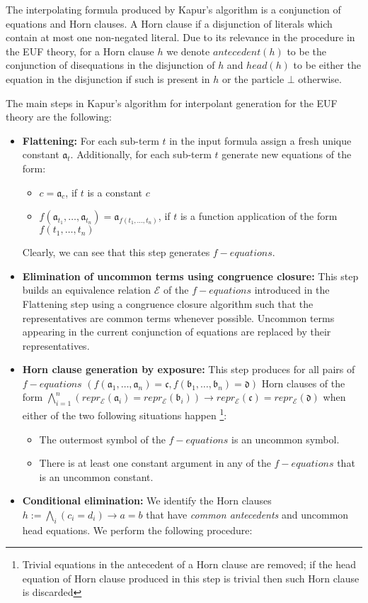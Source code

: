 The interpolating formula produced by Kapur's algorithm is a conjunction of equations
and Horn clauses. A Horn clause if a disjunction of literals which contain at most
one non-negated literal.
Due to its relevance in the procedure in the EUF theory, for a Horn clause $h$
we denote $antecedent(h)$ to be the conjunction of disequations in the disjunction of $h$ 
and $head(h)$ to be either the equation in the disjunction if such is present in $h$ 
or the particle $\bot$ otherwise.

The main steps in Kapur's algorithm for interpolant generation for the EUF theory
are the following:

\begin{itemize}
  \item \textbf{Flattening:} 
    For each sub-term $t$ in the input formula assign a fresh unique constant $\mathfrak{a}_t$. 
    Additionally, for each sub-term $t$ generate new equations of the form:
    \begin{itemize}
      \item $c = \mathfrak{a}_c$, if $t$ is a constant $c$
      \item $f(\mathfrak{a}_{t_1}, \dots, \mathfrak{a}_{t_n}) 
        = \mathfrak{a}_{f(t_1, \dots, t_n)}$, if $t$ is a 
        function application of the form $f(t_1, \dots, t_n)$
    \end{itemize}
    Clearly, we can see that this step generates $f-equations$.
  \item \textbf{Elimination of uncommon terms using congruence closure:}
    This step builds an equivalence 
    relation $\mathcal{E}$ of the $f-equations$ introduced in the 
    Flattening step using a congruence closure algorithm such 
    that the representatives are common terms
    whenever possible. Uncommon terms appearing in the current conjunction of 
    equations are replaced by their representatives.
  \item \textbf{Horn clause generation by exposure:} 
    This step produces for all pairs of $f-equations$ 
    $(f(\mathfrak{a}_1, \dots, \mathfrak{a}_n) = \mathfrak{c}, 
    f(\mathfrak{b}_1, \dots, \mathfrak{b}_n) = \mathfrak{d})$
    Horn clauses of the form 
    $\bigwedge_{i=1}^n(repr_{\mathcal{E}}(\mathfrak{a}_i) = repr_{\mathcal{E}}(\mathfrak{b}_i))
    \rightarrow repr_{\mathcal{E}}(\mathfrak{c}) = repr_{\mathcal{E}}(\mathfrak{d})$
    when either of the two following situations happen \footnote{Trivial equations in the antecedent
    of a Horn clause are removed; if the head equation of Horn clause produced in this 
    step is trivial then such Horn clause is discarded}:
    \begin{itemize}
      \item The outermost symbol of the $f-equations$ is an uncommon symbol.
      \item There is at least one constant argument in any of the $f-equations$ 
        that is an uncommon constant.
    \end{itemize}
  \item \textbf{Conditional elimination:} 
    We identify the Horn clauses $h := \bigwedge_i (c_i = d_i) \rightarrow a = b$
    that have \emph{common antecedents} and uncommon head equations. 
    We perform the following procedure: 


\end{itemize}
